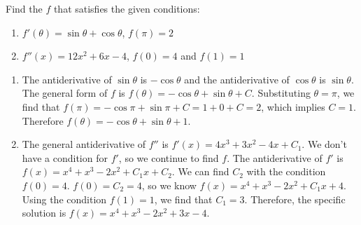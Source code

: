 \begin{Exercise}[label=antideriv4]
	Find the $f$ that satisfies the given conditions:
	\begin{enumerate}
	\item $f'(\theta) = \sin{\theta} + \cos{\theta}$, $f(\pi) = 2$
	\item $f''(x) = 12x^2 + 6x - 4$, $f(0) = 4$ and $f(1) = 1$
	\end{enumerate}
\end{Exercise}
	
\begin{Answer}[ref=antideriv4]
	\begin{enumerate}
	\item The antiderivative of $\sin{\theta}$ is $-\cos{\theta}$ and the 
	antiderivative of $\cos{\theta}$ is $\sin{\theta}$. The general form 
	of $f$ is $f(\theta) = -\cos{\theta} + \sin{\theta} + C$. 
	Substituting $\theta = \pi$, we find that $f(\pi) = -\cos{\pi} + 
	\sin{\pi} + C = 1 + 0 + C = 2$, which implies $C = 1$. Therefore 
	$f(\theta) = -\cos{\theta} + \sin{\theta} + 1$.
	\item The general antiderivative of $f''$ is $f'(x) = 4x^3 + 3x^2 - 
	4x + C_1$. We don't have a condition for $f'$, so we continue to find 
	$f$. The antiderivative of $f'$ is $f(x) = x^4 + x^3 - 2x^2 + C_1x + 
	C_2$. We can find $C_2$ with the condition $f(0) = 4$. $f(0) = C_2 
	= 4$, so we know $f(x) = x^4 + x^3 - 2x^2 + C_1x + 4$. Using the 
	condition $f(1) = 1$, we find that $C_1 = 3$. Therefore, the specific 
	solution is $f(x) = x^4 + x^3 - 2x^2 + 3x - 4$. 
	\end{enumerate}
	 
\end{Answer}



